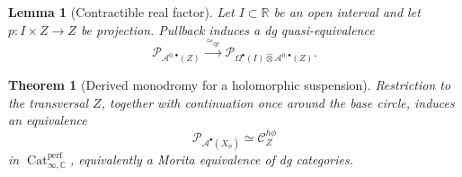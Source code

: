 \documentclass[10pt,a4paper]{amsart}
\newtheorem{thm}{Theorem}
\newtheorem{lem}{Lemma}
\newcommand{\C}{\mathbb C}
\newcommand{\CA}{\mathcal A}
\newcommand{\R}{\mathbb R}
\begin{document}
\begin{lem}[Contractible real factor]
\label{lem:contractible-real-factor}
Let \(I\subset\R\) be an open interval and let
\(p:I\times Z\to Z\) be projection.  Pullback induces a dg
quasi-equivalence
\[
\mathcal P_{\CA^{0,\bullet}(Z)}
\xrightarrow{\ \simeq_{\mathrm{qe}}\ }
\mathcal P_{\Omega^\bullet(I)\widehat\otimes
\CA^{0,\bullet}(Z)}.
\]
\end{lem}

\begin{thm}[Derived monodromy for a holomorphic suspension]
\label{thm:suspension-derived-monodromy}
Restriction to the transversal \(Z\), together with continuation once
around the base circle, induces an equivalence
\[
\boxed{
\mathcal P_{\CA^\bullet(X_\phi)}
\simeq
\mathcal C_Z^{h\phi}
}
\]
in \(\operatorname{Cat}^{\mathrm{perf}}_{\infty,\C}\), equivalently a
Morita equivalence of dg categories.
\end{thm}
\end{document}
